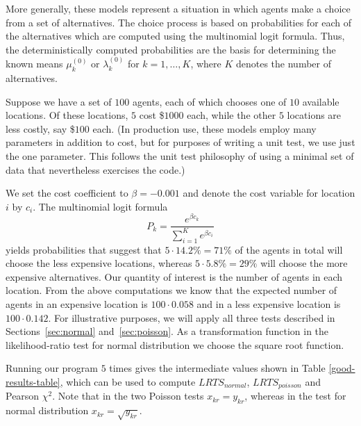 \documentclass{sig-alternate}
\begin{document}
More generally, these models represent a
situation in which agents make a choice from a set of alternatives. The choice
process is based on probabilities for each of the alternatives which are
computed using the multinomial logit formula.  Thus, the deterministically
computed probabilities are the basis for determining the known means
$\mu_k^{(0)}$ or $\lambda_k^{(0)}$ for $k=1,\dots,K$, where $K$ denotes the
number of alternatives.

Suppose we have a set of $100$ agents, each of which
chooses one of $10$ available locations.  Of these locations,
$5$ cost \$$1000$ each, while the other $5$ locations are less costly, say
\$$100$ each. (In production use, these models employ
many parameters in addition to cost, but
for purposes of writing a unit test, we use just the one parameter.
This follows the unit test philosophy of using a minimal set of data that
nevertheless exercises the code.)

We set the cost coefficient
to $\beta = -0.001$ and denote the cost variable for location $i$ by
$c_i$. The multinomial logit formula
\[
 P_{k} = \frac{e^{\beta c_k}}{\sum_{i=1}^{K}e^{\beta c_i}}
\]
yields probabilities that suggest that $5\cdot 14.2 \% = 71 \%$ of the agents
in total will choose the less expensive locations, whereas $5 \cdot 5.8 \% =
29 \%$ will choose the more expensive alternatives. Our quantity of interest
is the number of agents in each location. From the above computations we know
that the expected number of agents in an expensive location is $100 \cdot
0.058$ and in a less expensive location is $100 \cdot 0.142$.  For illustrative
purposes, we will apply all
three tests described in Sections~\ref{sec:normal} and~\ref{sec:poisson}.  As
a transformation function in the likelihood-ratio test for normal distribution
we choose the square root function.

Running our program $5$ times gives the intermediate values
shown in Table \ref{good-results-table}, which can be used to compute
$LRTS_{normal}$, $LRTS_{poisson}$ and Pearson $\chi^{2}$. Note that in the
two Poisson tests $x_{kr}=y_{kr}$, whereas in the test for normal distribution
$x_{kr}=\sqrt{y_{kr}}$.
\end{document}
